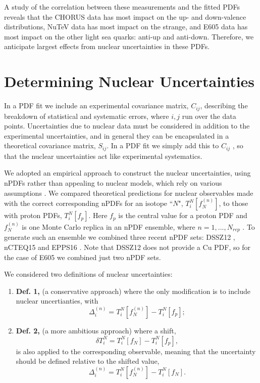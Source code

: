 A study of the correlation between these measurements and the fitted PDFs reveals that the CHORUS data has most impact on the up- and down-valence distributions, NuTeV data has most impact on the strange, and E605 data has most impact on the other light sea quarks: anti-up and anti-down. Therefore, we anticipate largest effects from nuclear uncertainties in these PDFs.
%
\section{Determining Nuclear Uncertainties} \label{sec:nucuncs}
%
In a PDF fit we include an experimental covariance matrix, $C_{ij}$, describing the breakdown of statistical and systematic errors, where $i,j$ run over the data points. Uncertainties due to nuclear data must be considered in addition to the experimental uncertainties, and in general they can be encapsulated in a theoretical covariance matrix, $S_{ij}$. In a PDF fit we simply add this to $C_{ij}$ \cite{Ball:2018odr}, so that the nuclear uncertainties act like experimental systematics.

We adopted an empirical approach to construct the nuclear uncertainties, using nPDFs rather than appealing to nuclear models, which rely on various assumptions \cite{Arneodo:1992wf}. We compared theoretical predictions for nuclear observables made with the correct corresponding nPDFs for an isotope ``$N$", $T_i^N[f_N^{(n)}]$, to those with proton PDFs, $T_i^N[f_p]$. Here $f_p$ is the central value for a proton PDF and $f_N^{(n)}$ is one Monte Carlo replica in an nPDF ensemble, where $n = 1, ..., N_{rep}$ \cite{Butterworth:2015oua}. To generate such an ensemble we combined three recent nPDF sets: DSSZ12 \cite{deFlorian:2011fp}, nCTEQ15 \cite{Kovarik:2015cma} and EPPS16 \cite{Eskola:2016oht}. Note that DSSZ12 does not provide a Cu PDF, so for the case of E605 we combined just two nPDF sets.

We considered two definitions of nuclear uncertainties:
\begin{enumerate}
\item \textbf{Def. 1, }(a conservative approach) where the only modification is to include nuclear uncertianties, with \begin{equation}
\Delta_i^{(n)} = T_i^N[f_N^{(n)}] - T_i^N[f_p];
\end{equation}
\item \textbf{Def. 2, } (a more ambitious approach) where a shift,
\begin{equation}
\delta T_i^N = T_i^N[f_N] - T_i^N[f_p],
\end{equation} 
is also applied to the corresponding observable, meaning that the uncertainty should be defined relative to the shifted value,
\begin{equation}
\Delta_i^{(n)} = T_i^N[f_N^{(n)}] - T_i^N[f_N].
\end{equation}
\end{enumerate}

